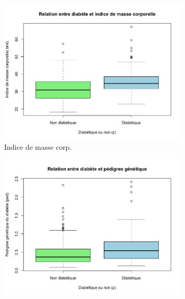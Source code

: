 \documentclass[a4paper,10pt]{report}
\begin{document}
\begin{figure}[H]
\begin{subfigure}[b]{0.25\linewidth}
		\label{fig:1-3-2-boxplot-diabete-pli-cutane}
	\end{subfigure}%
	\\
	\begin{subfigure}[b]{0.25\linewidth}
		\centering
		\captionsetup{justification=centering}
		\includegraphics[width=1\linewidth]{img/1-3-2-boxplot-diabete-indice-masse-corp}
		\caption{\scriptsize Indice de masse corp.}
		\label{fig:1-3-2-boxplot-diabete-indice-masse-corp}
	\end{subfigure}%
	\begin{subfigure}[b]{0.25\linewidth}
		\centering
		\captionsetup{justification=centering}
		\includegraphics[width=1\linewidth]{img/1-3-2-boxplot-diabete-pedigree}

\end{subfigure}
\end{figure}
\end{document}
